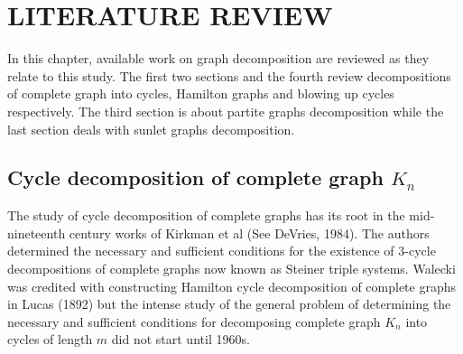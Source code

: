 \documentclass[12pt]{report}
\begin{document}
\chapter{LITERATURE REVIEW }
%
In this chapter, available work on graph decomposition  are reviewed
as they relate to this study. The first two sections and the fourth review decompositions of complete graph into cycles, Hamilton graphs and blowing up cycles respectively. The third section is about partite graphs decomposition while the last section deals with sunlet graphs decomposition.
\section{\protect\smallskip Cycle decomposition of complete graph $K_n$}

The study of cycle decomposition of complete graphs has its root in the mid-nineteenth century works of Kirkman et al (See DeVries, 1984). %
The authors determined the necessary and sufficient conditions for the existence of $3$-cycle  decompositions of complete graphs now known as Steiner triple systems. Walecki was credited with constructing Hamilton cycle decomposition of complete graphs in Lucas (1892) %
but the intense study of the general problem of determining the
necessary and sufficient conditions for decomposing  complete graph
$K_n$ into cycles of length $m$ did not start until 1960s.
\end{document}

